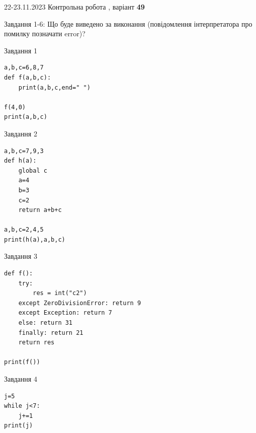 \documentclass[12pt, ukrainian]{article}
\begin{document}
{{22-23.11.2023 Контрольна робота , варіант  \No \textbf { 49 }\par}}
{

Завдання 1-6: Що буде виведено за виконання (повідомлення інтерпретатора про помилку позначати error)?


\begin{minipage}[t]{9.7cm}                
{\begin{center}Завдання {1}\end{center}}
\begin{verbatim}
a,b,c=6,8,7
def f(a,b,c):
    print(a,b,c,end=" ")

f(4,0)
print(a,b,c)
\end{verbatim}     
\end{minipage}
\vline \hspace{8mm}
\begin{minipage}[t]{8.0cm}                
{\begin{center}Завдання {2}\end{center}}
\begin{verbatim}
a,b,c=7,9,3
def h(a):
    global c
    a=4
    b=3
    c=2
    return a+b+c

a,b,c=2,4,5
print(h(a),a,b,c)
\end{verbatim}     
\end{minipage}

\vspace{15mm}
\begin{minipage}[t]{9.7cm}                
{\begin{center}Завдання {3}\end{center}}
\begin{verbatim}
def f():
    try:
        res = int("c2")
    except ZeroDivisionError: return 9
    except Exception: return 7
    else: return 31
    finally: return 21
    return res

print(f())
\end{verbatim}     
\end{minipage}
\vline \hspace{8mm}
\begin{minipage}[t]{8.0cm}                
{\begin{center}Завдання {4}\end{center}}
\begin{verbatim}
j=5
while j<7:
    j+=1
print(j)
\end{verbatim}     
\end{minipage}

}
\end{document}
